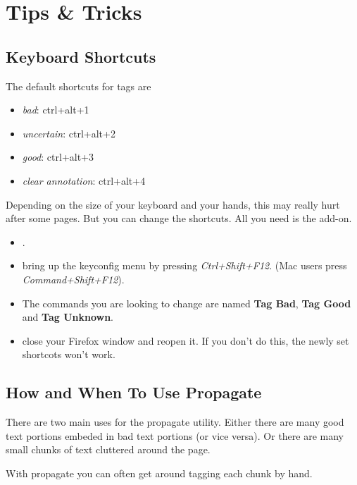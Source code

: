 \documentclass[12pt]{article}
\begin{document}
\section{Tips \& Tricks}
\label{TnT}
\subsection{Keyboard Shortcuts}
The default shortcuts for tags are \\
\begin{itemize}
	\item \emph{bad}: ctrl+alt+1
	\item \emph{uncertain}: ctrl+alt+2
	\item \emph{good}: ctrl+alt+3
	\item \emph{clear annotation}: ctrl+alt+4
\end{itemize}

Depending on the size of your keyboard and your hands, this may really hurt after some pages. But you can change the shortcuts. All you need is the  add-on.

\begin{itemize}
	\item {}.
	\item bring up the keyconfig menu by pressing \emph{Ctrl+Shift+F12}. (Mac users press \emph{Command+Shift+F12}).
	\item The commands you are looking to change are named \textbf{Tag Bad}, \textbf{Tag Good} and \textbf{Tag Unknown}.
	\item close your Firefox window and reopen it. If you don't do this, the newly set shortcots won't work.
\end{itemize}


\subsection{How and When To Use Propagate}
\label{TnTProp}
There are two main uses for the propagate utility. Either there are many good text portions embeded in bad text portions (or vice versa). Or there are many small chunks of text cluttered around the page.

With propagate you can often get around tagging each chunk by hand.
\end{document}
